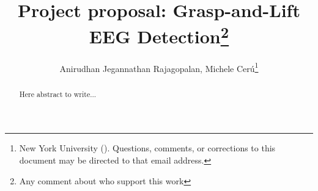 \documentclass[final,leqno,onefignum,onetabnum]{siamltexmm}
\title{Project proposal: Grasp-and-Lift EEG Detection\thanks{Any comment about who support this work}}
\author{Anirudhan Jegannathan Rajagopalan, Michele Cer\'u\thanks{New York University (\email{anirudhan.jegannathan@nyu.edu; mc3784@nyu.edu}). Questions, comments, or corrections
to this document may be directed to that email address.}}
\begin{document}
\maketitle
\newcommand{\slugmaster}{%
\slugger{siads}{xxxx}{xx}{x}{x--x}}%

\begin{abstract}
Here abstract to write... 
\end{abstract}

\begin{keywords}\end{keywords}

\begin{AMS}\end{AMS}


\pagestyle{myheadings}
\thispagestyle{plain}
\end{document}
